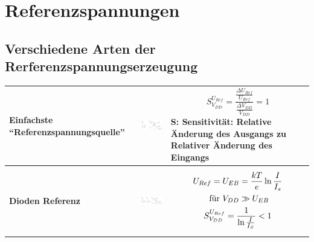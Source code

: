 \section{Referenzspannungen} 


\subsection{Verschiedene Arten der Rerferenzspannungserzeugung} 
	\begin{longtable}{|l|l|l|}
	\hline
		\begin{minipage}{4cm}
			\textbf{Einfachste "`Referenzspannungsquelle"'}
		\end{minipage}
	&
		\begin{minipage}{6cm}
			\includegraphics[width=6cm,trim=0 0 0 -5]{images/spannungsteiler}
		\end{minipage}
	&
		\begin{minipage}{8cm}
			\begin{equation*}
				S_{V_{DD}}^{U_{Ref}}=\frac{\frac{\Delta
				U_{Ref}}{U_{Ref}}}{\frac{\Delta V_{DD}}{V_{DD}}}=1
			\end{equation*}
			S: Sensitivität: Relative Änderung des Ausgangs zu Relativer Änderung des Eingangs
		\end{minipage}
	\\ \hline
		\begin{minipage}{4cm}
			\textbf{Dioden Referenz}
		\end{minipage}
	&
		\begin{minipage}{6cm}
			\includegraphics[width=6cm]{images/diodenReferenz}
		\end{minipage}
	&
		\begin{minipage}{8cm}
			\begin{gather*}
				U_{Ref}=U_{EB}=\frac{kT}{e}\ln{\frac{I}{I_{s}}} \notag\\
				\text{ für }V_{DD} \gg U_{EB}\\
				S_{V_{DD}}^{U_{Ref}}=\frac{1}{\ln{\frac{I}{I_{S}}}}<1

\end{gather*}
\end{minipage}
\end{longtable}
